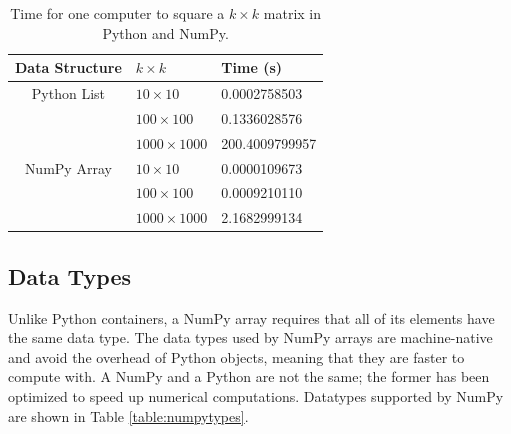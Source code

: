\begin{table}
 \begin{tabular}{|c|l|l|} \hline Data Structure & $k\times k$ & Time (s) \\ \hline 
 Python List  	& $10\times10$ 	& 0.0002758503 \\ 
 \cline{2-3} 	& $100\times100$ 	& 0.1336028576 \\ 
 \cline{2-3} 	& $1000\times1000$ & 200.4009799957 \\ 
\hline \hline 
 NumPy Array 	& $10\times10$ 	& 0.0000109673 \\
 \cline{2-3} 	& $100\times100$ 	& 0.0009210110 \\ 
 \cline{2-3} 	& $1000\times1000$ & 2.1682999134 \\
 \hline \end{tabular}
 \caption{Time for one computer to square a $k \times k$ matrix in Python and NumPy.}
\label{table:square_times} 
\end{table}
 
 
% 



\subsection*{Data Types}
Unlike Python containers, a NumPy array requires that all of its elements have the same data type. 
The data types used by NumPy arrays are machine-native and avoid the overhead of Python objects, meaning that they are faster to compute with. 
A NumPy  and a Python  are not the same; the former has been optimized to speed up numerical computations. 
Datatypes supported by NumPy are shown in Table \ref{table:numpytypes}.


